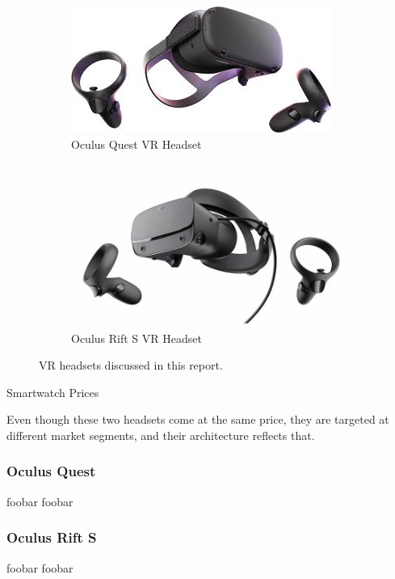 \begin{figure}[h]
    \centering
    \begin{subfigure}{.5\textwidth}
      \centering
      \includegraphics[width=.6\linewidth]{media/oculus_quest.jpg}
      \caption{Oculus Quest VR Headset \cite{quest_headset}}
      \label{head:sub1}
    \end{subfigure}%
    \begin{subfigure}{.5\textwidth}
        \centering
        \includegraphics[width=.6\linewidth]{media/oculus_rifts.jpg}
        \caption{Oculus Rift S VR Headset \cite{rift_headset}}
        \label{head:sub2}
      \end{subfigure}
    \caption{VR headsets discussed in this report.}
    \label{headsets:pictures}
\end{figure}

\begin{table}[h]
    \centering
    \caption{Smartwatch Prices}
    \label{headset:price} 
\end{table}

Even though these two headsets come at the same price, they are targeted at different
market segments, and their architecture reflects that.

\subsubsection{Oculus Quest}
foobar foobar

\subsubsection{Oculus Rift S}
foobar foobar

